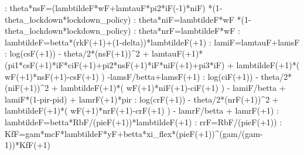 \documentclass{article}%
\begin{document}
   :  theta*nsF=(lambtildeF*wF+lamtauF*pi2*iF({-}1)*niF) *(1{-}theta\_lockdown*lockdown\_policy)\newline%
   :  theta*niF=lambtildeF*wF *(1{-}theta\_lockdown*lockdown\_policy)\newline%
   :  theta*nrF=lambtildeF*wF\newline%
   :  lambtildeF=betta*(rkF(+1)+(1{-}delta))*lambtildeF(+1)\newline%
   :  lamiF=lamtauF+lamsF\newline%
   :  log(csF(+1)) {-} theta/2*(nsF(+1))\^{}2 + lamtauF(+1)*(pi1*csF(+1)*iF*ciF(+1)+pi2*nsF(+1)*iF*niF(+1)+pi3*iF) + lambtildeF(+1)*( wF(+1)*nsF(+1){-}csF(+1) ) {-}lamsF/betta+lamsF(+1)\newline%
   :  log(ciF(+1)) {-} theta/2*(niF(+1))\^{}2 + lambtildeF(+1)*( wF(+1)*niF(+1){-}ciF(+1) ) {-} lamiF/betta + lamiF*(1{-}pir{-}pid) + lamrF(+1)*pir\newline%
   :  log(crF(+1)) {-} theta/2*(nrF(+1))\^{}2 + lambtildeF(+1)*( wF(+1)*nrF(+1){-}crF(+1) ) {-} lamrF/betta + lamrF(+1)\newline%
   :  lambtildeF=betta*RbF/(pieF(+1))*lambtildeF(+1)\newline%
   :  rrF=RbF/(pieF(+1))\newline%
   :  KfF=gam*mcF*lambtildeF*yF+betta*xi\_flex*(pieF(+1))\^{}(gam/(gam{-}1))*KfF(+1)\newline%
\newline%
\end{document}
